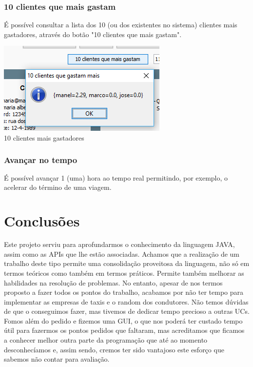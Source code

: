 \documentclass[a4paper]{article}
\begin{document}
\subsubsection{10 clientes que mais gastam}
É possível consultar a lista dos 10 (ou dos existentes no sistema) clientes mais gastadores, através do botão "10 clientes que mais gastam".
\begin{center}
  \includegraphics[scale=0.75]{outras_10mais}\\
  \caption{10 clientes mais gastadores}
  \label{fig:picture}
\end{center}
\subsubsection{Avançar no tempo}
É possível avançar 1 (uma) hora ao tempo real permitindo, por exemplo, o acelerar do término de uma viagem.


\section{Conclusões}
\label{sec:conclusao}
Este projeto serviu para aprofundarmos o conhecimento da linguagem JAVA, assim como as APIs que lhe estão associadas. Achamos que a realização de um trabalho deste tipo permite uma consolidação proveitosa da linguagem, não só em termos teóricos como também em termos práticos. Permite também melhorar as habilidades na resolução de problemas. No entanto, apesar de nos termos proposto a fazer todos os pontos do trabalho, acabamos por não ter tempo para implementar as empresas de taxis e o random dos condutores. Não temos dúvidas de que o conseguimos fazer, mas tivemos de dedicar tempo precioso a outras UCs. Fomos além do pedido e fizemos uma GUI, o que nos poderá ter custado tempo útil para fazermos os pontos pedidos que faltaram, mas acreditamos que ficamos a conhecer melhor outra parte da programação que até ao momento desconhecíamos e, assim sendo, cremos ter sido vantajoso este esforço que sabemos não contar para avaliação.
\end{document}
